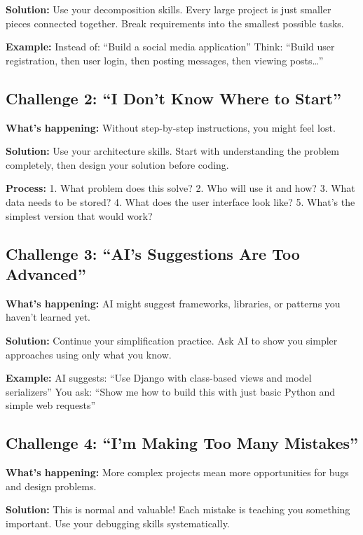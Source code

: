 \documentclass[
  letterpaper,
  DIV=11,
  numbers=noendperiod,
  oneside]{scrreprt}
\begin{document}
\textbf{Solution:} Use your decomposition skills. Every large project is
just smaller pieces connected together. Break requirements into the
smallest possible tasks.

\textbf{Example:} Instead of: ``Build a social media application''
Think: ``Build user registration, then user login, then posting
messages, then viewing posts\ldots{}''

\subsection{Challenge 2: ``I Don't Know Where to
Start''}\label{challenge-2-i-dont-know-where-to-start}

\textbf{What's happening:} Without step-by-step instructions, you might
feel lost.

\textbf{Solution:} Use your architecture skills. Start with
understanding the problem completely, then design your solution before
coding.

\textbf{Process:} 1. What problem does this solve? 2. Who will use it
and how? 3. What data needs to be stored? 4. What does the user
interface look like? 5. What's the simplest version that would work?

\subsection{Challenge 3: ``AI's Suggestions Are Too
Advanced''}\label{challenge-3-ais-suggestions-are-too-advanced}

\textbf{What's happening:} AI might suggest frameworks, libraries, or
patterns you haven't learned yet.

\textbf{Solution:} Continue your simplification practice. Ask AI to show
you simpler approaches using only what you know.

\textbf{Example:} AI suggests: ``Use Django with class-based views and
model serializers'' You ask: ``Show me how to build this with just basic
Python and simple web requests''

\subsection{Challenge 4: ``I'm Making Too Many
Mistakes''}\label{challenge-4-im-making-too-many-mistakes}

\textbf{What's happening:} More complex projects mean more opportunities
for bugs and design problems.

\textbf{Solution:} This is normal and valuable! Each mistake is teaching
you something important. Use your debugging skills systematically.
\end{document}
